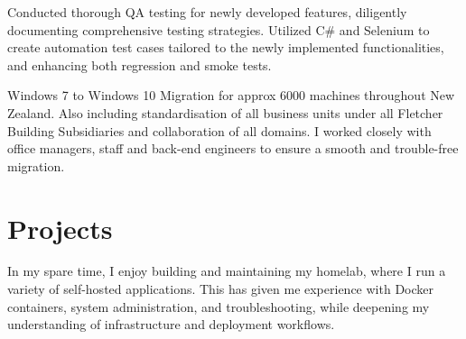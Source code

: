 \documentclass[a4paper]{deedy-resume} %
\begin{document}
\begin{minipage}[t]{0.66\textwidth}
\begin{tightitemize}
\end{tightitemize}

\sectionspace %


\begin{tightitemize}
\item Conducted thorough QA testing for newly developed features, diligently documenting comprehensive testing strategies. Utilized C\# and Selenium to create automation test cases tailored to the newly implemented functionalities, and enhancing both regression and smoke tests.\linebreak

\end{tightitemize}





\begin{tightitemize}
\item Windows 7 to Windows 10 Migration for approx 6000 machines throughout New Zealand. Also including standardisation of all business units under all Fletcher Building Subsidiaries and collaboration of all domains. I worked closely with office managers, staff and back-end engineers to ensure a smooth and trouble-free migration.
\end{tightitemize}
\section{Projects}
\descript{}
\begin{tightitemize}
\item In my spare time, I enjoy building and maintaining my homelab, where I run a variety of self-hosted applications. This has given me experience with Docker containers, system administration, and troubleshooting, while deepening my understanding of infrastructure and deployment workflows.
\end{tightitemize}


\end{minipage}
\end{document}
